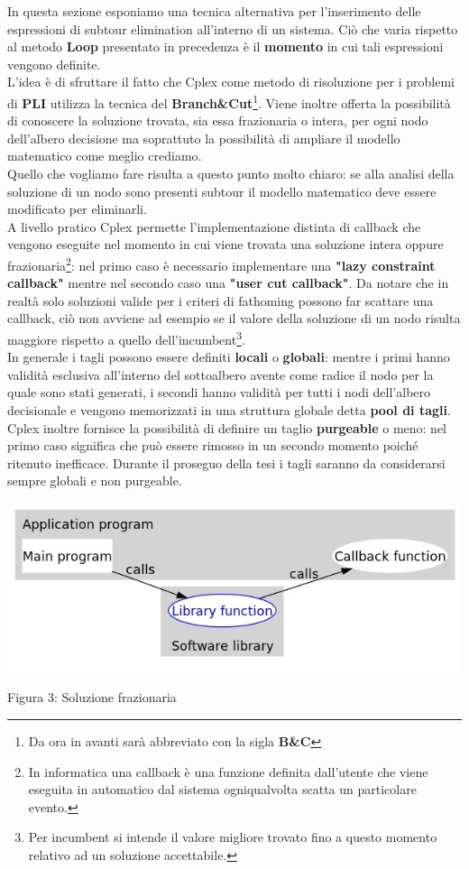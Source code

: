 \documentclass[11pt]{article}
\begin{document}
In questa sezione esponiamo una tecnica alternativa per l'inserimento delle espressioni di subtour elimination all'interno di un sistema. Ciò che varia rispetto al metodo \textbf{Loop} presentato in precedenza è il \textbf{momento} in cui tali espressioni vengono definite.\\
L'idea è di sfruttare il fatto che Cplex come metodo di risoluzione per i problemi di \textbf{PLI} utilizza la tecnica del \textbf{Branch\&Cut}\footnote{Da ora in avanti sarà abbreviato con la sigla \textbf{B\&C}}. Viene inoltre offerta la possibilità di conoscere la soluzione trovata, sia essa frazionaria o intera, per ogni nodo dell'albero decisione ma soprattuto la possibilità di ampliare il modello matematico come meglio crediamo.\\
Quello che vogliamo fare risulta a questo punto molto chiaro: se alla analisi della soluzione di un nodo sono presenti subtour il modello matematico deve essere modificato per eliminarli.\\
A livello pratico Cplex permette l'implementazione distinta di callback che vengono eseguite nel momento in cui viene trovata una soluzione intera oppure frazionaria\footnote{In informatica una callback è una funzione definita dall'utente che viene eseguita in automatico dal sistema ogniqualvolta scatta un particolare evento.}: nel primo caso è necessario implementare una \textbf{"lazy constraint callback"} mentre nel secondo caso una \textbf{"user cut callback"}. Da notare che in realtà solo soluzioni valide per i criteri di fathoming possono far scattare una callback, ciò non avviene ad esempio se il valore della soluzione di un nodo risulta maggiore rispetto a quello dell'incumbent\footnote{Per incumbent si intende il valore migliore trovato fino a questo momento relativo ad un soluzione accettabile.}.\\
In generale i tagli possono essere definiti \textbf{locali} o \textbf{globali}: mentre i primi hanno validità esclusiva all'interno del sottoalbero avente come radice il nodo per la quale sono stati generati, i secondi hanno validità per tutti i nodi dell'albero decisionale e vengono memorizzati in una struttura globale detta \textbf{pool di tagli}. Cplex inoltre fornisce la possibilità di definire un taglio \textbf{purgeable} o meno: nel primo caso significa che può essere rimosso in un secondo momento poiché ritenuto inefficace. Durante il proseguo della tesi i tagli saranno da considerarsi sempre globali e non purgeable.

\begin{center}
    \includegraphics[scale=0.5]{Callback}  
    
    Figura 3: Soluzione frazionaria
\end{center}
\end{document}
